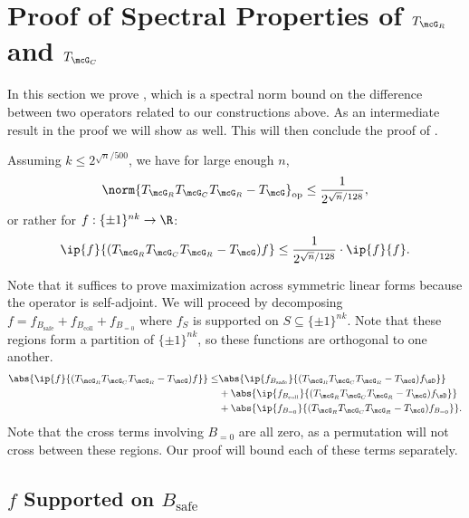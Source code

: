 \section{Proof of Spectral Properties of $T_{\mcG_R}$ and $T_{\mcG_C}$}
\label{sec:spectralproof}

In this section we prove , which is a spectral norm bound on the difference between two operators related to our constructions above. As an intermediate result in the proof we will show  as well. This will then conclude the proof of .

\begin{lemma}
    Assuming $k \leq 2^{\sqrt{n}/500}$, we have for large enough $n$,
    \begin{equation*}
        \norm{T_{\mcG_R}T_{\mcG_C}T_{\mcG_R} - T_\mcG}_{\mathrm{op}} \leq \frac{1}{2^{\sqrt{n}/128}},
    \end{equation*}
    or rather for $f : \{\pm 1 \}^{nk} \to \R$:
    \begin{equation*}
        \ip{f}{(T_{\mcG_R}T_{\mcG_C}T_{\mcG_R} - T_\mcG) f} \leq \frac{1}{2^{\sqrt{n}/128}}\cdot \ip{f}{f}.
    \end{equation*}
\end{lemma}

Note that it suffices to prove maximization across symmetric linear forms because the operator is self-adjoint. We will proceed by decomposing $f = f_{B_{\mathrm{safe}}} + f_{B_{\mathrm{coll}}} + f_{B_{=0}}$ where $f_S$ is supported on $S \subseteq \{\pm1\}^{nk}$. Note that these regions form a partition of $\{\pm1\}^{nk}$, so these functions are orthogonal to one another.
\begin{align*}
    \abs{\ip{f}{(T_{\mcG_R}T_{\mcG_C}T_{\mcG_R} - T_\mcG) f}} \leq& \abs{\ip{f_{B_{\mathrm{safe}}}}{(T_{\mcG_R}T_{\mcG_C}T_{\mcG_R} - T_\mcG) f_{\sD}}}\\
    &+ \abs{\ip{f_{B_{\mathrm{coll}}}}{(T_{\mcG_R}T_{\mcG_C}T_{\mcG_R} - T_\mcG) f_\sD}}\\
    &+ \abs{\ip{f_{B_{=0}}}{(T_{\mcG_R}T_{\mcG_C}T_{\mcG_R} - T_\mcG) f_{B_{=0}}}}.
\end{align*}
Note that the cross terms involving $B_{=0}$ are all zero, as a permutation will not cross between these regions. Our proof will bound each of these terms separately.

\subsection{$f$ Supported on $B_{\textrm{safe}}$}

